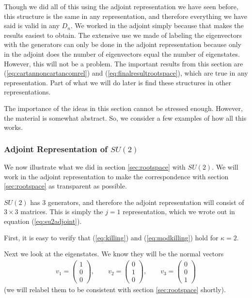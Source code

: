 \documentclass[12pt,epsf]{article}
\def\nolabel{\nonumber }
\def\nolabel{\nonumber }
\begin{document}
Though we did all of this using the adjoint representation we have
seen before, this structure is the same in any representation, and
therefore everything we have said is valid in any $D_n$.  We worked in
the adjoint simply because that makes the results easiest to obtain. 
The extensive use we made of labeling the eigenvectors with the
generators can only be done in the adjoint representation because only
in the adjoint does the number of eigenvectors equal the number of
eigenstates. However, this will not be a problem.  The important
results from this section are (\ref{eq:cartannoncartancomrel}) and
(\ref{eq:finalresultrootspace}), which are true in any representation. 
Part of what we will do later is find these structures in other
representations.  

The importance of the ideas in this section cannot be stressed enough. 
However, the material is somewhat abstract.  So, we consider a few
examples of how all this works.  

\subsubsection{Adjoint Representation of $SU(2)$}
\label{sec:adjointsu2}

We now illustrate what we did in section \ref{sec:rootspace} with
$SU(2)$.  We will work in the adjoint representation to make the
correspondence with section \ref{sec:rootspace} as transparent as
possible.  

$SU(2)$ has 3 generators, and therefore the adjoint representation
will consist of $3\times 3$ matrices.  This is simply the $j=1$
representation, which we wrote out in equation (\ref{eq:su2adjoint}).

First, it is easy to verify that (\ref{eq:killing}) and
(\ref{eq:modkilling}) hold for $\kappa = 2$.  

Next we look at the eigenstates.  We know they will be the normal
vectors
\begin{eqnarray}
v_1 = \begin{pmatrix} 1 \\ 0 \\ 0 \end{pmatrix}, \qquad v_2 =
\begin{pmatrix} 0 \\ 1 \\ 0 \end{pmatrix}, \qquad v_3 = \begin{pmatrix}
0 \\ 0 \\ 1 \end{pmatrix}\nolabel
\end{eqnarray}
(we will relabel them to be consistent with section \ref{sec:rootspace}
shortly).  
\end{document}
